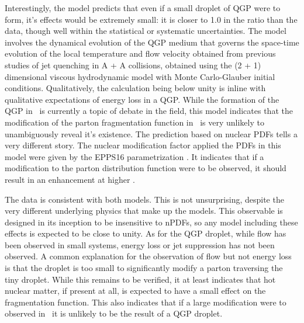 Interestingly, the model predicts that even if a small droplet of QGP were to form, it's effects would be extremely small: it is closer to 1.0 in the ratio than the data, though well within the statistical or systematic uncertainties. The model involves the dynamical evolution of the QGP medium that governs the space-time evolution of the local temperature and flow velocity obtained from previous studies of jet quenching in A + A collisions, obtained using the (2 + 1) dimensional viscous hydrodynamic model with Monte Carlo-Glauber initial conditions. Qualitatively, the calculation being below unity is inline with qualitative expectations of energy loss in a QGP. While the formation of the QGP in \pPb~is currently a topic of debate in the field, this model indicates that the modification of the parton fragmentation function in \pPb~is very unlikely to unambiguously reveal it's existence. The prediction based on nuclear PDFs tells a very different story. The nuclear modification factor applied the PDFs in this model were given by the EPPS16 parametrization \cite{Eskola2017a}. It indicates that if a modification to the parton distribution function were to be observed, it should result in an enhancement at higher \zt. 

The data is consistent with both models. This is not unsurprising, despite the very different underlying physics that make up the models. This observable is designed in its inception to be insensitive to nPDFs, so any model including these effects is expected to be close to unity. As for the QGP droplet, while flow has been observed in small systems, energy loss or jet suppression has not been observed. A common explanation for the observation of flow but not energy loss is that the droplet is too small to significantly modify a parton traversing the tiny droplet. While this remains to be verified, it at least indicates that hot nuclear matter, if present at all, is expected to have a small effect on the fragmentation function. This also indicates that if a large modification were to observed in \pPb~it is unlikely to be the result of a QGP droplet.
